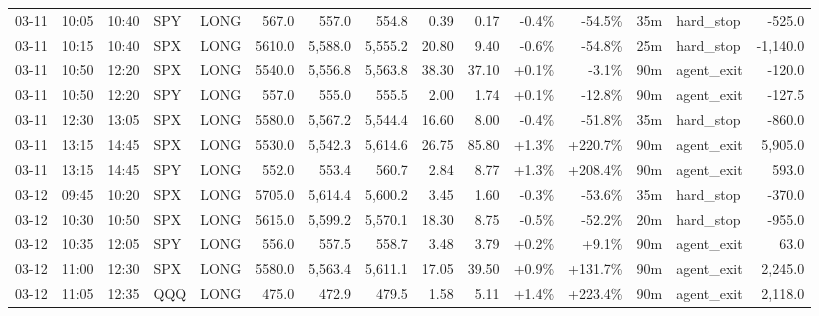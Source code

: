 \documentclass[11pt,a4paper,twoside]{article}
\begin{document}
\begin{landscape}
\begin{center}
\begin{longtable}{>{\color{txtmain}}l l l l l r r r r r r r r >{\color{txtmain}}l r}
03-11 & 10:05 & 10:40 & SPY & LONG & 567.0 & 557.0 & 554.8 & 0.39 & 0.17 & \textcolor{lossred}{-0.4\%} & \textcolor{lossred}{-54.5\%} & 35m & hard\_stop & \textcolor{lossred}{-525.0} \\
03-11 & 10:15 & 10:40 & SPX & LONG & 5610.0 & 5,588.0 & 5,555.2 & 20.80 & 9.40 & \textcolor{lossred}{-0.6\%} & \textcolor{lossred}{-54.8\%} & 25m & hard\_stop & \textcolor{lossred}{-1,140.0} \\
03-11 & 10:50 & 12:20 & SPX & LONG & 5540.0 & 5,556.8 & 5,563.8 & 38.30 & 37.10 & \textcolor{wingreen}{+0.1\%} & \textcolor{lossred}{-3.1\%} & 90m & agent\_exit & \textcolor{lossred}{-120.0} \\
03-11 & 10:50 & 12:20 & SPY & LONG & 557.0 & 555.0 & 555.5 & 2.00 & 1.74 & \textcolor{wingreen}{+0.1\%} & \textcolor{lossred}{-12.8\%} & 90m & agent\_exit & \textcolor{lossred}{-127.5} \\
03-11 & 12:30 & 13:05 & SPX & LONG & 5580.0 & 5,567.2 & 5,544.4 & 16.60 & 8.00 & \textcolor{lossred}{-0.4\%} & \textcolor{lossred}{-51.8\%} & 35m & hard\_stop & \textcolor{lossred}{-860.0} \\
03-11 & 13:15 & 14:45 & SPX & LONG & 5530.0 & 5,542.3 & 5,614.6 & 26.75 & 85.80 & \textcolor{wingreen}{+1.3\%} & \textcolor{wingreen}{+220.7\%} & 90m & agent\_exit & \textcolor{wingreen}{5,905.0} \\
03-11 & 13:15 & 14:45 & SPY & LONG & 552.0 & 553.4 & 560.7 & 2.84 & 8.77 & \textcolor{wingreen}{+1.3\%} & \textcolor{wingreen}{+208.4\%} & 90m & agent\_exit & \textcolor{wingreen}{593.0} \\
03-12 & 09:45 & 10:20 & SPX & LONG & 5705.0 & 5,614.4 & 5,600.2 & 3.45 & 1.60 & \textcolor{lossred}{-0.3\%} & \textcolor{lossred}{-53.6\%} & 35m & hard\_stop & \textcolor{lossred}{-370.0} \\
03-12 & 10:30 & 10:50 & SPX & LONG & 5615.0 & 5,599.2 & 5,570.1 & 18.30 & 8.75 & \textcolor{lossred}{-0.5\%} & \textcolor{lossred}{-52.2\%} & 20m & hard\_stop & \textcolor{lossred}{-955.0} \\
03-12 & 10:35 & 12:05 & SPY & LONG & 556.0 & 557.5 & 558.7 & 3.48 & 3.79 & \textcolor{wingreen}{+0.2\%} & \textcolor{wingreen}{+9.1\%} & 90m & agent\_exit & \textcolor{wingreen}{63.0} \\
03-12 & 11:00 & 12:30 & SPX & LONG & 5580.0 & 5,563.4 & 5,611.1 & 17.05 & 39.50 & \textcolor{wingreen}{+0.9\%} & \textcolor{wingreen}{+131.7\%} & 90m & agent\_exit & \textcolor{wingreen}{2,245.0} \\
03-12 & 11:05 & 12:35 & QQQ & LONG & 475.0 & 472.9 & 479.5 & 1.58 & 5.11 & \textcolor{wingreen}{+1.4\%} & \textcolor{wingreen}{+223.4\%} & 90m & agent\_exit & \textcolor{wingreen}{2,118.0} \\

\end{longtable}
\end{center}
\end{landscape}
\end{document}
